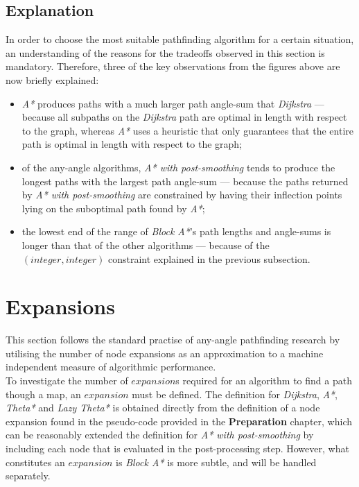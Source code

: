 \documentclass[12pt,notitlepage]{report}
\begin{document}
\subsection{Explanation}
In order to choose the most suitable pathfinding algorithm for a certain situation, an understanding of the reasons for the tradeoffs observed in this section is mandatory. Therefore, three of the key observations from the figures above are now briefly explained: 
\begin{itemize}
\item {\em A*} produces paths with a much larger path angle-sum that {\em Dijkstra} --- because all subpaths on the {\em Dijkstra} path are optimal in length with respect to the graph, whereas {\em A*} uses a heuristic that only guarantees that the entire path is optimal in length with respect to the graph;
\item of the any-angle algorithms, {\em A* with post-smoothing} tends to produce the longest paths with the largest path angle-sum --- because the paths returned by {\em A* with post-smoothing} are constrained by having their inflection points lying on the suboptimal path found by {\em A*};
\item the lowest end of the range of {\em Block A*}'s path lengths and angle-sums is longer than that of the other algorithms --- because of the $(integer,integer)$ constraint explained in the previous subsection. 
\end{itemize}

\section{Expansions}
This section follows the standard\cite{Nash12} practise of any-angle pathfinding research by utilising the number of node expansions as an approximation to a machine independent measure of algorithmic performance.\\

\noindent
To investigate the number of $expansion$s required for an algorithm  to find a path though a map, an $expansion$ must be defined. The definition for {\em Dijkstra}, {\em A*}, {\em Theta*} and {\em Lazy Theta*} is obtained directly from the definition of a node expansion found in the pseudo-code provided in the {\bfseries Preparation} chapter, which can be reasonably extended the definition for {\em A* with post-smoothing} by including each node that is evaluated in the post-processing step. However, what constitutes an $expansion$ is {\em Block A*} is more subtle, and will be handled separately.\\
\end{document}
